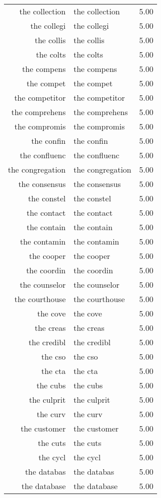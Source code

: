 \begin{table}[ht]
\begin{tabular}{rlr}
  the collection & the collection & 5.00 \\ 
  the collegi & the collegi & 5.00 \\ 
  the collis & the collis & 5.00 \\ 
  the colts & the colts & 5.00 \\ 
  the compens & the compens & 5.00 \\ 
  the compet & the compet & 5.00 \\ 
  the competitor & the competitor & 5.00 \\ 
  the comprehens & the comprehens & 5.00 \\ 
  the compromis & the compromis & 5.00 \\ 
  the confin & the confin & 5.00 \\ 
  the confluenc & the confluenc & 5.00 \\ 
  the congregation & the congregation & 5.00 \\ 
  the consensus & the consensus & 5.00 \\ 
  the constel & the constel & 5.00 \\ 
  the contact & the contact & 5.00 \\ 
  the contain & the contain & 5.00 \\ 
  the contamin & the contamin & 5.00 \\ 
  the cooper & the cooper & 5.00 \\ 
  the coordin & the coordin & 5.00 \\ 
  the counselor & the counselor & 5.00 \\ 
  the courthouse & the courthouse & 5.00 \\ 
  the cove & the cove & 5.00 \\ 
  the creas & the creas & 5.00 \\ 
  the credibl & the credibl & 5.00 \\ 
  the cso & the cso & 5.00 \\ 
  the cta & the cta & 5.00 \\ 
  the cubs & the cubs & 5.00 \\ 
  the culprit & the culprit & 5.00 \\ 
  the curv & the curv & 5.00 \\ 
  the customer & the customer & 5.00 \\ 
  the cuts & the cuts & 5.00 \\ 
  the cycl & the cycl & 5.00 \\ 
  the databas & the databas & 5.00 \\ 
  the database & the database & 5.00 \\ 

\end{tabular}
\end{table}
